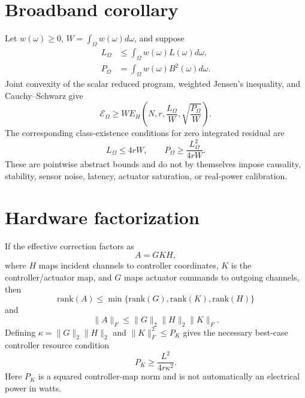 \documentclass[aps,pra,onecolumn,superscriptaddress,nofootinbib]{revtex4-2}
\begin{document}
\section{Broadband corollary}
Let $w(\omega)\ge0$, $W=\int_\Omega w(\omega)d\omega$, and suppose
\begin{align}
L_\Omega&\le\int_\Omega w(\omega)L(\omega)d\omega,\\
P_\Omega&=\int_\Omega w(\omega)B^2(\omega)d\omega.
\end{align}
Joint convexity of the scalar reduced program, weighted Jensen's inequality, and Cauchy--Schwarz give
\begin{equation}
\boxed{
\mathcal E_\Omega\ge
W E_H\!\left(N,r,\frac{L_\Omega}{W},\sqrt{\frac{P_\Omega}{W}}\right).}
\end{equation}
The corresponding class-existence conditions for zero integrated residual are
\begin{equation}
L_\Omega\le4rW,
\qquad
P_\Omega\ge\frac{L_\Omega^2}{4rW}.
\end{equation}
These are pointwise abstract bounds and do not by themselves impose causality, stability, sensor noise, latency, actuator saturation, or real-power calibration.

\section{Hardware factorization}
If the effective correction factors as
\begin{equation}
A=GKH,
\end{equation}
where $H$ maps incident channels to controller coordinates, $K$ is the controller/actuator map, and $G$ maps actuator commands to outgoing channels, then
\begin{equation}
\mathrm{rank}(A)\le\min\{\mathrm{rank}(G),\mathrm{rank}(K),\mathrm{rank}(H)\}
\end{equation}
and
\begin{equation}
\|A\|_F\le\|G\|_2\|H\|_2\|K\|_F.
\end{equation}
Defining $\kappa=\|G\|_2\|H\|_2$ and $\|K\|_F^2\le P_K$ gives the necessary best-case controller resource condition
\begin{equation}
\boxed{P_K\ge\frac{L^2}{4r\kappa^2}.}
\end{equation}
Here $P_K$ is a squared controller-map norm and is not automatically an electrical power in watts.
\end{document}
